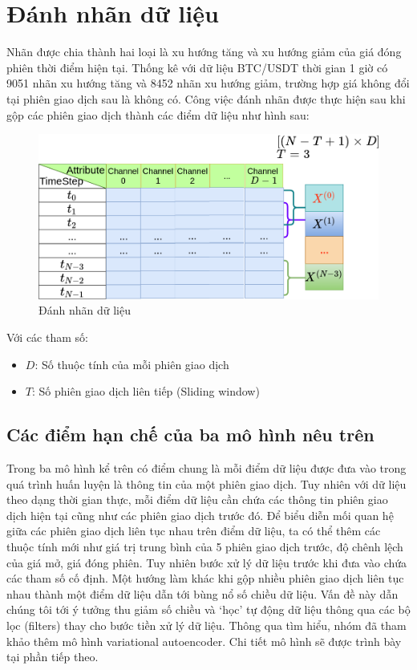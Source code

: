 \section{Đánh nhãn dữ liệu} \label{data-labeling}
Nhãn được chia thành hai loại là xu hướng tăng và xu hướng giảm của giá đóng phiên thời điểm hiện tại. Thống kê với dữ liệu BTC/USDT thời gian 1 giờ có 9051 nhãn xu hướng tăng và 8452 nhãn xu hướng giảm, trường hợp giá không đổi tại phiên giao dịch sau là không có. Công việc đánh nhãn được thực hiện sau khi gộp các phiên giao dịch thành các điểm dữ liệu như hình sau:
\begin{figure}[hbt!]
    \centering
	\includegraphics[width=.8\textwidth]{figures/labeling.png}
	\caption{Đánh nhãn dữ liệu}
	\label{fig:Labeling}

\end{figure}


Với các tham số:
\begin{itemize}
    \item $D$: Số thuộc tính của mỗi phiên giao dịch
    \item $T$: Số phiên giao dịch liên tiếp (Sliding window)
\end{itemize}


\subsection*{Các điểm hạn chế của ba mô hình nêu trên}
Trong ba mô hình kể trên có điểm chung là mỗi điểm dữ liệu được đưa vào trong quá trình huấn luyện là thông tin của một phiên giao dịch. Tuy nhiên với dữ liệu theo dạng thời gian thực, mỗi điểm dữ liệu cần chứa các thông tin phiên giao dịch hiện tại cũng như các phiên giao dịch trước đó. Để biểu diễn mối quan hệ giữa các phiên giao dịch liên tục nhau trên điểm dữ liệu, ta có thể thêm các thuộc tính mới như giá trị trung bình của 5 phiên giao dịch trước, độ chênh lệch của giá mở, giá đóng phiên. Tuy nhiên bước xử lý dữ liệu trước khi đưa vào chứa các tham số cố định. Một hướng làm khác khi gộp nhiều phiên giao dịch liên tục nhau thành một điểm dữ liệu dẫn tới bùng nổ số  chiều dữ liệu. Vấn đề này dẫn chúng tôi tới ý tưởng thu giảm số chiều và `học' tự động dữ liệu thông qua các bộ lọc (filters) thay cho bước tiền xử lý dữ liệu. Thông qua tìm hiểu, nhóm đã tham khảo thêm mô hình variational autoencoder. Chi tiết mô hình sẽ được trình bày tại phần tiếp theo.

